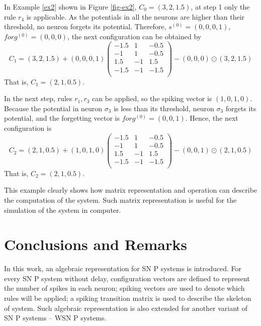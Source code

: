 \documentclass[runningheads]{llncs}
\begin{document}
In Example \ref{ex2} shown in Figure \ref{fig-ex2}, $C_0=(3,2,1.5)$,
at step 1 only the rule $r_4$ is applicable. As the potentials in
all the neurons are higher than their threshold, no neuron forgets
its potential. Therefore, $s^{(0)}=(0,0,0,1)$, $forg^{(0)}=(0,0,0)$,
the next configuration can be obtained by
\begin{equation}
C_1=(3, 2, 1.5)+(0, 0,0,1)\left(
\begin{array}{ccc}
-1.5 & 1 & -0.5\\
  -1   & 1 &-0.5\\
  1.5  & -1 & 1.5\\
  -1.5 & -1 &  -1.5 \\
\end{array}
\right)-(0, 0, 0)\odot (3, 2, 1.5)
\end{equation}
That is, $C_1=(2, 1, 0.5)$.

In the next step, rules $r_1, r_3$ can be applied, so the spiking
vector is $(1,0,1,0)$. Because the potential in neuron $\sigma_3$ is
less than its threshold, neuron $\sigma_3$ forgets its potential,
and the forgetting vector is $forg^{(0)}=(0,0,1)$. Hence, the next
configuration is
\begin{equation}
C_2=(2, 1, 0.5)+(1, 0, 1, 0)\left(
\begin{array}{ccc}
-1.5 & 1 & -0.5\\
  -1   & 1 &-0.5\\
  1.5  & -1 & 1.5\\
  -1.5 & -1 &  -1.5 \\
\end{array}
\right)-(0, 0, 1)\odot (2, 1, 0.5)
\end{equation}
That is, $C_2=(2, 1, 0.5)$.

This example clearly shows how matrix representation and operation
can describe the computation of the system. Such matrix
representation is useful for the simulation of the system in
computer.

\section{Conclusions and Remarks}
In this work, an algebraic representation for SN P systems is
introduced. For every SN P system without delay, configuration
vectors are defined to represent the number of spikes in each
neuron; spiking vectors are used to denote which rules will be
applied; a spiking transition matrix is used to describe the
skeleton of system. Such algebraic representation is also extended
for another variant of SN P systems -- WSN P systems.
\end{document}
